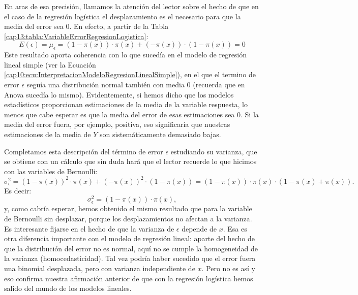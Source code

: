 	En aras de esa precisión, llamamos la atención del lector sobre el hecho de que en el caso de la regresión logística el desplazamiento es el necesario para que la media del error sea $0$. En efecto, a partir de la Tabla \ref{cap13:tabla:VariableErrorRegresionLogistica}:
	\[
	E(\epsilon) = \mu_{\epsilon} = (1 - \pi(x))\cdot \pi(x) + (-\pi(x))\cdot (1 -\pi(x)) = 0
	\]
	Este resultado aporta coherencia con lo que sucedía en el modelo de regresión lineal simple (ver la Ecuación \ref{cap10:ecu:InterpretacionModeloRegresionLinealSimple}), en el que el termino de error $\epsilon$ seguía una distribución normal también con media $0$ (recuerda que en Anova sucedía lo mismo). Evidentemente, si hemos dicho que los modelos estadísticos proporcionan estimaciones de la media de la variable respuesta, lo menos que cabe esperar es que la media del error de esas estimaciones sea $0$. Si la media del error fuera, por ejemplo, positiva, eso significaría que nuestras estimaciones de la media de $Y$ son sistemáticamente demasiado bajas.
	
	Completamos esta descripción del  término de error $\epsilon$ estudiando su varianza, que se obtiene con un cálculo que sin duda hará que el lector recuerde lo que hicimos con las variables de Bernoulli:
	\[
	\sigma^2_{\epsilon} = (1 - \pi(x))^2\cdot \pi(x) + (-\pi(x))^2\cdot (1 -\pi(x)) = (1 - \pi(x))\cdot \pi(x)\cdot ( 1 - \pi(x) + \pi(x)).
	\]
	Es decir:
	\[
	\sigma^2_{\epsilon} = (1 - \pi(x))\cdot \pi(x),
	\]
	y, como cabría esperar, hemos obtenido el mismo resultado que para la variable de Bernoulli sin desplazar, porque los desplazamientos no afectan a la varianza. Es interesante fijarse en el hecho de que la varianza de $\epsilon$ depende de $x$. Esa es otra diferencia importante con el modelo de regresión lineal: aparte del hecho de que la distribución del error no es normal, aquí no se cumple la homogeneidad de la varianza (homocedasticidad). Tal vez podría haber sucedido que el error fuera una binomial desplazada, pero con varianza independiente de $x$. Pero no es así y eso confirma nuestra afirmación  anterior de que con la regresión logística hemos salido del mundo de los modelos lineales.
	
	
	
	
